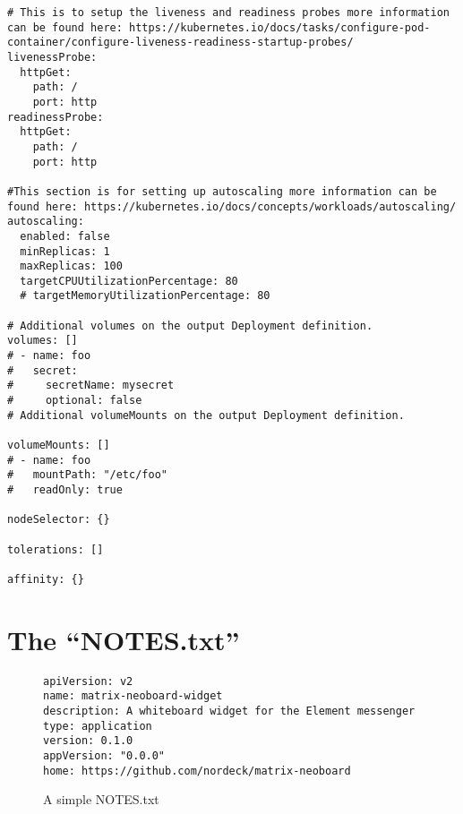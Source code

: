 \documentclass[english]{scrbook}
\begin{document}
\begin{singlespace}
\begin{verbatim}
# This is to setup the liveness and readiness probes more information can be found here: https://kubernetes.io/docs/tasks/configure-pod-container/configure-liveness-readiness-startup-probes/
livenessProbe:
  httpGet:
    path: /
    port: http
readinessProbe:
  httpGet:
    path: /
    port: http
    
#This section is for setting up autoscaling more information can be found here: https://kubernetes.io/docs/concepts/workloads/autoscaling/
autoscaling:
  enabled: false
  minReplicas: 1
  maxReplicas: 100
  targetCPUUtilizationPercentage: 80
  # targetMemoryUtilizationPercentage: 80
  
# Additional volumes on the output Deployment definition.
volumes: []
# - name: foo
#   secret:
#     secretName: mysecret
#     optional: false
# Additional volumeMounts on the output Deployment definition.

volumeMounts: []
# - name: foo
#   mountPath: "/etc/foo"
#   readOnly: true

nodeSelector: {}

tolerations: []

affinity: {}
\end{verbatim}
\end{singlespace}
\label{code:values.yaml}
\endgroup

\section{The \enquote{NOTES.txt}}
\begin{figure}[!hp]
\centering
\begin{singlespace}
\begin{verbatim}
apiVersion: v2
name: matrix-neoboard-widget
description: A whiteboard widget for the Element messenger
type: application
version: 0.1.0
appVersion: "0.0.0"
home: https://github.com/nordeck/matrix-neoboard
\end{verbatim}
\end{singlespace}
\caption{A simple NOTES.txt}\label{code:NOTES.txt}
\end{figure}
\cleardoublepage
\appendix
\printglossaries

\nocite{*}
\printbibliography[heading=bibintoc,title={Sources}]

\listoffigures
\end{document}
